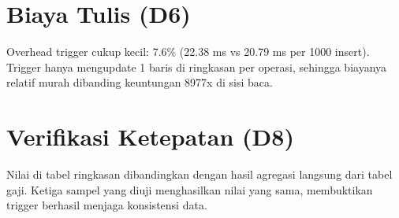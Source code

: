 
\section{Biaya Tulis (D6)}
Overhead trigger cukup kecil: 7.6\% (22.38 ms vs 20.79 ms per 1000 insert). Trigger hanya mengupdate 1 baris di ringkasan per operasi, sehingga biayanya relatif murah dibanding keuntungan 8977x di sisi baca.


\section{Verifikasi Ketepatan (D8)}
Nilai di tabel ringkasan dibandingkan dengan hasil agregasi langsung dari tabel gaji. Ketiga sampel yang diuji menghasilkan nilai yang sama, membuktikan trigger berhasil menjaga konsistensi data.

